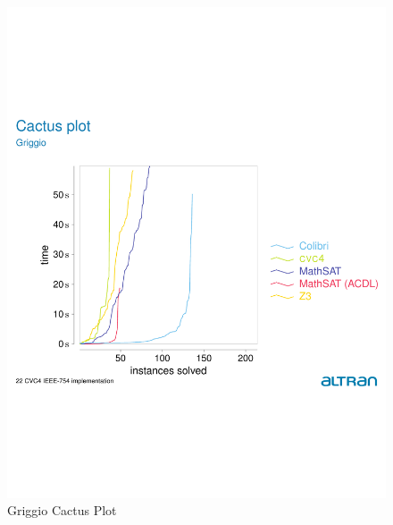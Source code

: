 \documentclass{easychair}
\begin{document}
\begin{figure}[h]
\caption{Griggio Cactus Plot\label{CVC22}}
\vskip-100pt
\includegraphics[scale=0.8]{ExtractCVC22.pdf}
\end{figure}
\end{document}
